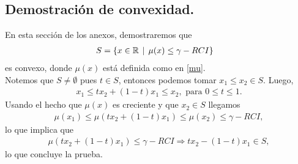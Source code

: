 \subsection{Demostración de convexidad.} \label{demostracion convexidad}
En esta sección de los anexos, demostraremos que
\begin{align*}
    S &= \left\lbrace x \in \mathbb{R} \hspace{0.15cm} | \hspace{0.15cm} \mu(x) \leq \gamma - RCI \right\rbrace
\end{align*}
es convexo, donde $\mu(x)$ está definida como en \ref{mu}.\\
Notemos que $S\neq \emptyset$ pues $t\in S$, entonces podemos tomar $x_1 \leq x_2 \in S$.  Luego, 
\begin{align*}
   x_1 \leq tx_2 + (1-t)x_1 \leq x_2, \text{ para } 0\leq t \leq 1.
\end{align*}
Usando el hecho que $\mu(x)$ es creciente y que $x_2 \in S$ llegamos 
\begin{align*}
    \mu(x_1) \leq \mu(tx_2 + (1-t)x_1) \leq \mu(x_2) \leq \gamma - RCI,
\end{align*}
lo que implica que 
\begin{align*}
    \mu(tx_2 + (1-t)x_1) \leq \gamma - RCI \Rightarrow tx_2 - (1-t)x_1 \in S,
\end{align*}
lo que concluye la prueba.


